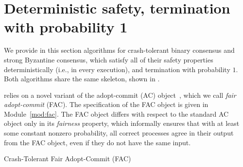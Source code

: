 \section{Deterministic safety, termination with probability 1}
\label{sec:warmup}

We provide in this section algorithms for crash-tolerant binary consensus and strong Byzantine consensus, which satisfy all of their safety properties deterministically (i.e., in every execution), and termination with probability $1$. Both algorithms share the same skeleton, shown in . 

 relies on a novel variant of the adopt-commit (AC) object~\cite{ac1, ac2}, which we call \textit{fair adopt-commit} (FAC). The specification of the FAC object is given in Module~\ref{mod:fac}. The FAC object differs with respect to the standard AC object only in its \textit{fairness} property, which informally ensures that with at least some constant nonzero probability, all correct processes agree in their output from the FAC object, even if they do not have the same input.

\begin{module}
\caption{Crash-Tolerant Fair Adopt-Commit (FAC)}
\label{mod:fac}
\end{module}

